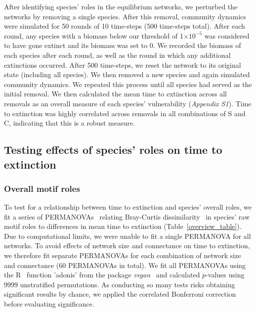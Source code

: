 \documentclass[12pt]{article}
\begin{document}
    		After identifying species' roles in the equilibrium networks, we perturbed the networks by removing a single species. After this removal, community dynamics were simulated for 50 rounds of 10 time-steps (500 time-steps total). After each round, any species with a biomass below our threshold of 1$\times10^{-5}$ was considered to have gone extinct and its biomass was set to 0. We recorded the biomass of each species after each round, as well as the round in which any additional extinctions occurred. After 500 time-steps, we reset the network to its original state (including all species). We then removed a new species and again simulated community dynamics. We repeated this process until all species had served as the initial removal.
    		We then calculated the mean time to extinction across all removals as an overall measure of each species' vulnerability (\emph{Appendix S1}). 
    		Time to extinction was highly correlated across removals in all combinations of S and C, indicating that this is a robust measure.


	\subsection*{Testing effects of species' roles on time to extinction}

		\subsubsection*{Overall motif roles}

			To test for a relationship between time to extinction and species' overall roles, we fit a series of PERMANOVAs~\citep{Anderson2001} relating Bray-Curtis dissimilarity~\citep{Baker2015,Cirtwill2015} in species' raw motif roles to differences in mean time to extinction (Table~\ref{overview_table}).
			Due to computational limits, we were unable to fit a single PERMANOVA for all networks.
			To avoid effects of network size and connectance on time to extinction, we therefore fit separate PERMANOVAs for each combination of network size and connectance (60 PERMANOVAs in total).
			We fit all PERMANOVAs using the R~\citep{R} function 'adonis' from the package \emph{vegan}~\citep{vegan} and calculated $p$-values using 9999 unstratified permutations.
			As conducting so many tests risks obtaining significant results by chance, we applied the correlated Bonferroni correction~\citep{Drezner2016} before evaluating significance.
			
\end{document}
